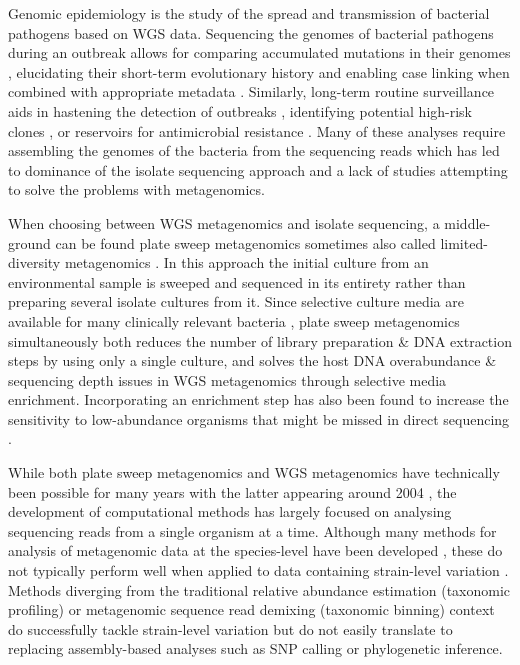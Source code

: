 \documentclass[officiallayout]{tktla}
\begin{document}
Genomic epidemiology is the study of the spread and transmission of
bacterial pathogens based on WGS data. Sequencing the genomes of
bacterial pathogens during an outbreak allows for comparing
accumulated mutations in their genomes \citep{tang2017infection},
elucidating their short-term evolutionary history and enabling case
linking when combined with appropriate metadata
\citep{grad2014epidemiologic, hill2021progress}. Similarly, long-term
routine surveillance aids in hastening the detection of outbreaks
\citep{eyre2012pilot, gardy2018towards}, identifying potential
high-risk clones \citep{aanensen2016whole}, or reservoirs for
antimicrobial resistance \citep{weingarten2018genomic,
  coipan2020genomic}. Many of these analyses require assembling the
genomes of the bacteria from the sequencing reads which has led to
dominance of the isolate sequencing approach and a lack of studies
attempting to solve the problems with metagenomics.

When choosing between WGS metagenomics and isolate sequencing, a
middle-ground can be found plate sweep metagenomics
\cite{maklin_high-resolution_2021} \textemdash sometimes also called
limited-diversity metagenomics \citep{cocker_drivers_2022}. In this
approach the initial culture from an environmental sample is sweeped
and sequenced in its entirety rather than preparing several isolate
cultures from it. Since selective culture media are available for many
clinically relevant bacteria \citep{lagier2015current}, plate sweep
metagenomics simultaneously both reduces the number of library
preparation \& DNA extraction steps by using only a single culture,
and solves the host DNA overabundance \& sequencing depth issues in
WGS metagenomics through selective media enrichment. Incorporating an
enrichment step has also been found to increase the sensitivity to
low-abundance organisms that might be missed in direct sequencing
\citep{whelan2020culture}.

While both plate sweep metagenomics and WGS metagenomics have
technically been possible for many years with the latter appearing
around 2004 \citep{tyson2004community, venter2004environmental}, the
development of computational methods has largely focused on analysing
sequencing reads from a single organism at a time. Although many
methods for analysis of metagenomic data at the species-level have
been developed \citep{breitwieser2019review}, these do not typically
perform well when applied to data containing strain-level variation
\citep{sczyrba2017critical}. Methods diverging from the traditional
relative abundance estimation (taxonomic profiling)
\citep{truong2017microbial} or metagenomic sequence read demixing
(taxonomic binning) \citep{van2022strainge} context do successfully
tackle strain-level variation but do not easily translate to replacing
assembly-based analyses such as SNP calling or phylogenetic inference.
\end{document}
